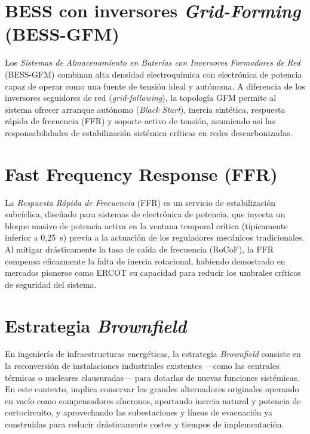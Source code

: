\section{BESS con inversores \textit{Grid-Forming} (BESS-GFM)}
\label{anexo:bess_gfm}
Los \textit{Sistemas de Almacenamiento en Baterías con Inversores
Formadores de Red} (BESS-GFM) combinan alta densidad electroquímica con
electrónica de potencia capaz de operar como una fuente de tensión ideal
y autónoma. A diferencia de los inversores seguidores de red
(\textit{grid-following}), la topología GFM permite al sistema ofrecer
arranque autónomo (\textit{Black Start}), inercia sintética, respuesta
rápida de frecuencia (FFR) y soporte activo de tensión, asumiendo así
las responsabilidades de estabilización sistémica críticas en redes
descarbonizadas.

\section{Fast Frequency Response (FFR)}
\label{anexo:ffr}
La \textit{Respuesta Rápida de Frecuencia} (FFR) es un servicio de
estabilización subcíclica, diseñado para sistemas de electrónica de
potencia, que inyecta un bloque masivo de potencia activa en la ventana
temporal crítica (típicamente inferior a 0{,}25~s) previa a la actuación
de los reguladores mecánicos tradicionales. Al mitigar drásticamente la
tasa de caída de frecuencia (RoCoF), la FFR compensa eficazmente la falta
de inercia rotacional, habiendo demostrado en mercados pioneros como
ERCOT su capacidad para reducir los umbrales críticos de seguridad del
sistema.

\section{Estrategia \textit{Brownfield}}
\label{anexo:brownfield}
En ingeniería de infraestructuras energéticas, la estrategia
\textit{Brownfield} consiste en la reconversión de instalaciones
industriales existentes ---como las centrales térmicas o nucleares
clausuradas--- para dotarlas de nuevas funciones sistémicas. En este
contexto, implica conservar los grandes alternadores originales operando
en vacío como compensadores síncronos, aportando inercia natural y
potencia de cortocircuito, y aprovechando las subestaciones y líneas de
evacuación ya construidas para reducir drásticamente costes y tiempos de
implementación.

